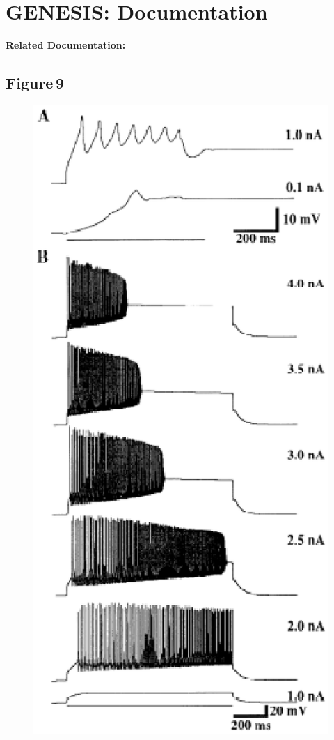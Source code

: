 \documentclass[12pt]{article}
\begin{document}
\section*{GENESIS: Documentation}

{\bf Related Documentation:}

\subsection*{Figure\,9}

\begin{figure}[h]
\centering
   \includegraphics[scale=0.65]{figures/Fig.1.9.eps}

\end{figure}
\end{document}

